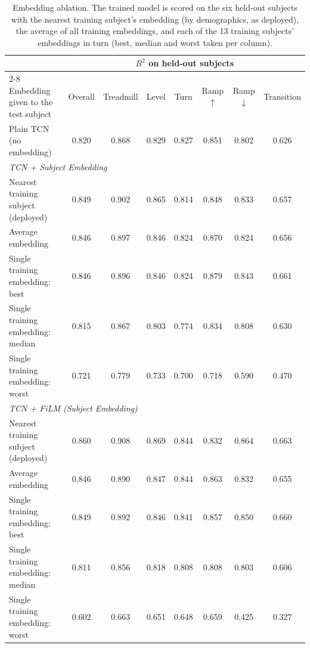 \begin{table}[t]
\centering
\small
\setlength{\tabcolsep}{4pt}
\begin{tabular}{l ccccccc}
\toprule
 & \multicolumn{7}{c}{$R^2$ on held-out subjects} \\
\cmidrule(lr){2-8}
Embedding given to the test subject & Overall & Treadmill & Level & Turn & Ramp $\uparrow$ & Ramp $\downarrow$ & Transition \\
\midrule
Plain TCN (no embedding) & 0.820 & 0.868 & 0.829 & 0.827 & 0.851 & 0.802 & 0.626 \\
\midrule
\multicolumn{8}{l}{\textit{TCN + Subject Embedding}} \\
\quad Nearest training subject (deployed) & 0.849 & 0.902 & 0.865 & 0.814 & 0.848 & 0.833 & 0.657 \\
\quad Average embedding & 0.846 & 0.897 & 0.846 & 0.824 & 0.870 & 0.824 & 0.656 \\
\quad Single training embedding: best & 0.846 & 0.896 & 0.846 & 0.824 & 0.879 & 0.843 & 0.661 \\
\quad Single training embedding: median & 0.815 & 0.867 & 0.803 & 0.774 & 0.834 & 0.808 & 0.630 \\
\quad Single training embedding: worst & 0.721 & 0.779 & 0.733 & 0.700 & 0.718 & 0.590 & 0.470 \\
\midrule
\multicolumn{8}{l}{\textit{TCN + FiLM (Subject Embedding)}} \\
\quad Nearest training subject (deployed) & 0.860 & 0.908 & 0.869 & 0.844 & 0.832 & 0.864 & 0.663 \\
\quad Average embedding & 0.846 & 0.890 & 0.847 & 0.844 & 0.863 & 0.832 & 0.655 \\
\quad Single training embedding: best & 0.849 & 0.892 & 0.846 & 0.841 & 0.857 & 0.850 & 0.660 \\
\quad Single training embedding: median & 0.811 & 0.856 & 0.818 & 0.808 & 0.808 & 0.803 & 0.606 \\
\quad Single training embedding: worst & 0.602 & 0.663 & 0.651 & 0.648 & 0.659 & 0.425 & 0.327 \\
\bottomrule
\end{tabular}
\caption{Embedding ablation. The trained model is scored on the six held-out subjects with the nearest training subject's embedding (by demographics, as deployed), the average of all training embeddings, and each of the 13 training subjects' embeddings in turn (best, median and worst taken per column).}
\label{tab:embedding_ablation}
\end{table}

